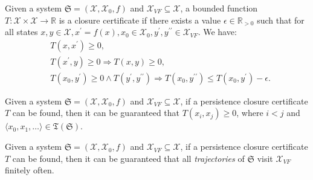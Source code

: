 \documentclass[acmlarge]{acmart}
\begin{document}
\begin{definition}
\label{pcc-def}
Given a system $\mathfrak{S}=(\mathcal{X}, \mathcal{X}_0, f)$ and $\mathcal{X}_{VF} \subseteq \mathcal{X}$, a bounded function $T:\mathcal{X} \times \mathcal{X} \rightarrow \mathbb{R}$ is a closure certificate if there exists a value $\epsilon \in \mathbb{R}_{>0}$ such that for all states $x, y \in \mathcal{X}, x^{\prime} = f(x), x_0 \in \mathcal{X}_0, y^{\prime}, y^{\prime\prime} \in \mathcal{X}_{VF}$. We have:
\begin{align}
  &T(x, x^{\prime}) \geq 0, \label{cc1}\\
  &T(x^{\prime}, y) \geq 0 \Rightarrow T(x, y) \geq 0, \label{cc2} \\
  &T(x_0, y^{\prime}) \geq 0 \land T(y^{\prime}, y^{\prime\prime}) \Rightarrow T(x_0, y^{\prime\prime}) \leq T(x_0, y^{\prime}) - \epsilon. \label{cc3}
\end{align}
\end{definition}

\begin{lemma}
\label{cc-lemma}
Given a system $\mathfrak{S}=(\mathcal{X}, \mathcal{X}_0, f)$ and $\mathcal{X}_{VF} \subseteq \mathcal{X}$, if a persistence closure certificate $T$ can be found, then it can be guaranteed that $T(x_i, x_j) \geq 0$, where $i < j$ and $\langle x_0, x_1, \dots \rangle \in \mathfrak{T}(\mathfrak{S})$.
\end{lemma}

\begin{theorem}[persistence]
  Given a system $\mathfrak{S}=(\mathcal{X}, \mathcal{X}_0, f)$ and $\mathcal{X}_{VF} \subseteq \mathcal{X}$, if a persistence closure certificate $T$ can be found, then it can be guaranteed that all \emph{trajectories} of $\mathfrak{S}$ visit \(\mathcal{X}_{VF}\) finitely often. 
\end{theorem}
\end{document}
